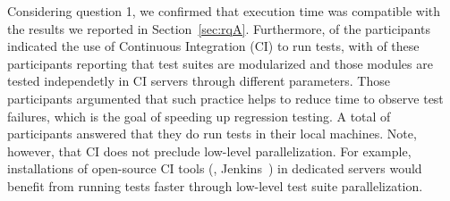
Considering question 1, we confirmed that execution time was
compatible with the results we reported in Section~\ref{sec:rqA}.
Furthermore, \emailsCI{} of the participants indicated the use of
Continuous Integration (CI) to run tests, with \emailsDistributed{} of
these participants reporting that test suites are modularized and
those modules are tested independetly in CI servers through different
parameters.  Those participants argumented that such practice helps to
reduce time to observe test failures, which is the goal of speeding up
regression testing.  A total of \emailsLocal{} participants answered
that they do run tests in their local machines.  Note, however, that
CI does not preclude low-level parallelization.  For example,
installations of open-source CI tools (\eg{}, Jenkins~\cite{jenkins})
in dedicated servers would benefit from running tests faster through
low-level test suite parallelization.


